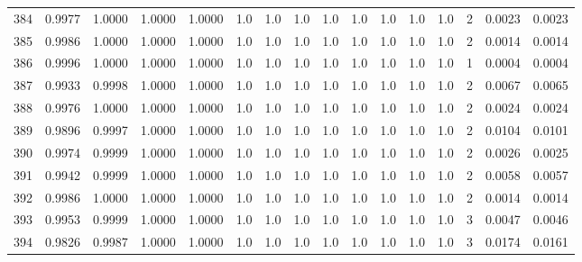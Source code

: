 \begin{tabular}{lrrrrrrrrrrrrrrr}
384 &      0.9977 &  1.0000 &  1.0000 &  1.0000 &     1.0 &     1.0 &     1.0 &     1.0 &     1.0 &     1.0 &      1.0 &        1.0 &      2 &                    0.0023 &                     0.0023 \\
385 &      0.9986 &  1.0000 &  1.0000 &  1.0000 &     1.0 &     1.0 &     1.0 &     1.0 &     1.0 &     1.0 &      1.0 &        1.0 &      2 &                    0.0014 &                     0.0014 \\
386 &      0.9996 &  1.0000 &  1.0000 &  1.0000 &     1.0 &     1.0 &     1.0 &     1.0 &     1.0 &     1.0 &      1.0 &        1.0 &      1 &                    0.0004 &                     0.0004 \\
387 &      0.9933 &  0.9998 &  1.0000 &  1.0000 &     1.0 &     1.0 &     1.0 &     1.0 &     1.0 &     1.0 &      1.0 &        1.0 &      2 &                    0.0067 &                     0.0065 \\
388 &      0.9976 &  1.0000 &  1.0000 &  1.0000 &     1.0 &     1.0 &     1.0 &     1.0 &     1.0 &     1.0 &      1.0 &        1.0 &      2 &                    0.0024 &                     0.0024 \\
389 &      0.9896 &  0.9997 &  1.0000 &  1.0000 &     1.0 &     1.0 &     1.0 &     1.0 &     1.0 &     1.0 &      1.0 &        1.0 &      2 &                    0.0104 &                     0.0101 \\
390 &      0.9974 &  0.9999 &  1.0000 &  1.0000 &     1.0 &     1.0 &     1.0 &     1.0 &     1.0 &     1.0 &      1.0 &        1.0 &      2 &                    0.0026 &                     0.0025 \\
391 &      0.9942 &  0.9999 &  1.0000 &  1.0000 &     1.0 &     1.0 &     1.0 &     1.0 &     1.0 &     1.0 &      1.0 &        1.0 &      2 &                    0.0058 &                     0.0057 \\
392 &      0.9986 &  1.0000 &  1.0000 &  1.0000 &     1.0 &     1.0 &     1.0 &     1.0 &     1.0 &     1.0 &      1.0 &        1.0 &      2 &                    0.0014 &                     0.0014 \\
393 &      0.9953 &  0.9999 &  1.0000 &  1.0000 &     1.0 &     1.0 &     1.0 &     1.0 &     1.0 &     1.0 &      1.0 &        1.0 &      3 &                    0.0047 &                     0.0046 \\
394 &      0.9826 &  0.9987 &  1.0000 &  1.0000 &     1.0 &     1.0 &     1.0 &     1.0 &     1.0 &     1.0 &      1.0 &        1.0 &      3 &                    0.0174 &                     0.0161 \\

\end{tabular}
